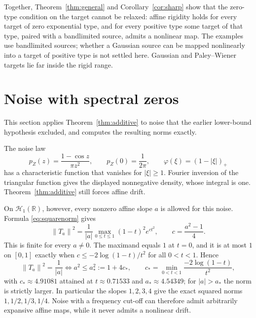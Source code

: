 \documentclass[11pt,a4paper]{article}
\theoremstyle{remark}
\newcommand{\R}{\mathbb R}
\newcommand{\HH}{\mathcal H}
\newcommand{\norm}[1]{\left\lVert#1\right\rVert}
\begin{document}
Together, Theorem~\ref{thm:general} and Corollary~\ref{cor:sharp} show
that the zero-type condition on the target cannot be relaxed: affine
rigidity holds for every target of zero exponential type, and for every
positive type some target of that type, paired with a bandlimited
source, admits a nonlinear map. The examples use bandlimited sources;
whether a Gaussian source can be mapped nonlinearly into a target of
positive type is not settled here. Gaussian and Paley--Wiener targets lie
far inside the rigid range.

\section{Noise with spectral zeros}\label{sec:zeros}

This section applies Theorem~\ref{thm:additive} to noise that the
earlier lower-bound hypothesis excluded, and computes the resulting
norms exactly.

The noise law
\begin{equation}\label{eq:triangular}
 p_Z(z)=\frac{1-\cos z}{\pi z^2},\qquad
 p_Z(0)=\frac1{2\pi},
 \qquad
 \varphi(\xi)=(1-|\xi|)_+
\end{equation}
has a characteristic function that vanishes for $|\xi|\ge1$. Fourier
inversion of the triangular function gives the displayed nonnegative
density, whose integral is one. Theorem~\ref{thm:additive} still forces
affine drift.

On $\HH_1(\R)$, however, every nonzero affine slope $a$ is allowed
for this noise. Formula \eqref{eq:squarenorm} gives
\begin{equation}\label{eq:triangularnorm}
 \norm{T_a}^2=\frac1{|a|}
       \max_{0\le t\le1}(1-t)^2
                    e^{ct^2},\qquad c=\frac{a^2-1}{4}.
\end{equation}
This is finite for every $a\ne0$. The maximand equals $1$ at $t=0$, and
it is at most $1$ on $[0,1]$ exactly when $c\le-2\log(1-t)/t^2$ for all
$0<t<1$. Hence
\begin{equation}\label{eq:astar}
 \norm{T_a}^2=\frac1{|a|}\iff
 a^2\le a_*^2:=1+4c_*,\qquad
 c_*=\min_{0<t<1}\frac{-2\log(1-t)}{t^2},
\end{equation}
with $c_*\approx4.91081$ attained at $t\approx0.71533$ and
$a_*\approx4.54349$; for $|a|>a_*$ the norm is strictly larger. In
particular the slopes $1,2,3,4$ give the exact squared norms
$1,1/2,1/3,1/4$. Noise with a frequency cut-off can therefore admit
arbitrarily expansive affine maps, while it never admits a nonlinear
drift.
\end{document}
